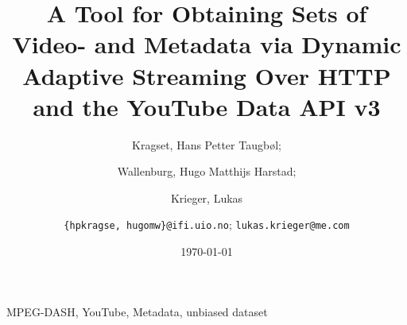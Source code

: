 \documentclass[10pt,journal]{IEEEtran}
\title{A Tool for Obtaining Sets of Video- and Metadata via Dynamic Adaptive
Streaming Over HTTP and the YouTube Data API v3}
\author{
    Kragset, Hans Petter Taugb\o l;
    \and
    Wallenburg, Hugo Matthijs Harstad;
    \and
    Krieger, Lukas
    \and
    \newline
    \texttt{\{hpkragse, hugomw\}@ifi.uio.no};
    \texttt{lukas.krieger@me.com}
}
\date{\today}
\begin{document}
\maketitle



\begin{IEEEkeywords}
    MPEG-DASH, YouTube, Metadata, unbiased dataset
\end{IEEEkeywords}
















%




\end{document}
